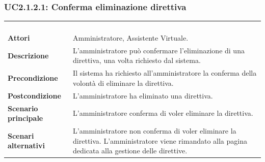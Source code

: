 \subsubsection{UC2.1.2.1: Conferma eliminazione direttiva}
\label{UC2.1.2.1}
\begin{longtable}{l|p{10cm}}
	\rowcolor[gray]{0.8} \multicolumn{2}{c}{} \\
	\rowcolor[gray]{0.8} \multicolumn{2}{c}{\textbf{UC2.1.2.1 - Conferma eliminazione direttiva}} \\
	\rowcolor[gray]{0.8} \multicolumn{2}{c}{} \\
	\hline
	&\\
	\textbf{Attori} & Amministratore, Assistente Virtuale.\\[7pt]
	\textbf{Descrizione} & L'amministratore può confermare l'eliminazione di una direttiva, una volta richiesto dal sistema.\\[7pt]
	\textbf{Precondizione} & Il sistema ha richiesto all'amministratore la conferma della volontà di eliminare la direttiva.\\[7pt]
	\textbf{Postcondizione} & L'amministratore ha eliminato una direttiva.\\[7pt]
	\textbf{Scenario principale} &L'amministratore conferma di voler eliminare la direttiva.\\[7pt]
	\textbf{Scenari alternativi} & L'amministratore non conferma di voler eliminare la direttiva. L'amministratore viene rimandato alla pagina dedicata alla gestione delle direttive.\\[7pt]\hline
\end{longtable}

